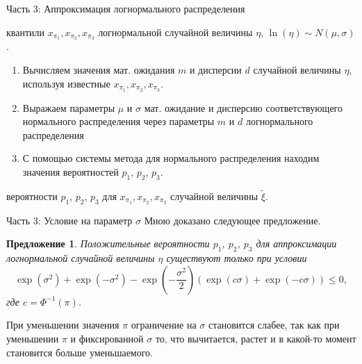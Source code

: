 \documentclass[ucs, notheorems, handout]{beamer}
\newtheorem{proposition2}[theorem]{Предложение}
\newenvironment{pr1}{\par\noindent{\bf Дано:}}{}
\newenvironment{pr3}{\par\noindent{\bf Результат:}}{}
\begin{document}
	
	\begin{frame}{Часть 3: Аппроксимация логнормального распределения}
			\begin{pr1}
				квантили $x_{\pi_{1}}, x_{\pi_{2}}, x_{\pi_{3}}$ логнормальной случайной величины $\eta$, $\ln(\eta) \sim N(\mu, \sigma)$.
			\end{pr1}
		
		\bigskip
		
			\begin{enumerate}
				\item Вычисляем значения мат. ожидания $m$ и дисперсии $d$ случайной величины $\eta$, используя известные $x_{\pi_{1}}, x_{\pi_{2}}, x_{\pi_{3}}$.
				\item Выражаем параметры $\mu$ и $\sigma$ мат. ожидание и дисперсию соответствующего нормального распределения через параметры $m$ и $d$ логнормального распределения
				\item С помощью системы метода для нормального распределения находим значения вероятностей $p_{1}$, $p_{2}$, $p_{3}$.
			\end{enumerate}
		\bigskip
			\begin{pr3}\end{pr3} вероятности $p_{1}$, $p_{2}$, $p_{3}$ для $x_{\pi_{1}}, x_{\pi_{2}}, x_{\pi_{3}}$ случайной величины $\tilde{\xi}$.
		
	\end{frame}

\begin{frame}{Часть 3: Условие на параметр $\sigma$}
	Мною доказано следующее предложение.
		\begin{proposition2}
		Положительные вероятности $p_{1}$, $p_{2}$, $p_{3}$ для аппроксимации логнормальной случайной величины $\eta$ существуют только при условии \[\exp(\sigma^{2})+\exp(-\sigma^{2})-\exp\left( -\dfrac{\sigma^{2}}{2}\right) 
		(\exp(c\sigma)+\exp(-c\sigma))\leq 0,\] 
		где $c = \Phi^{-1}(\pi)$.
	\end{proposition2}
	
	При уменьшении значения $\pi$ ограничение на $\sigma$ становится слабее, так как при уменьшении $\pi$ и фиксированной $\sigma$ то, что вычитается, растет и в какой-то
	момент становится больше уменьшаемого.

\end{frame}
\end{document}
